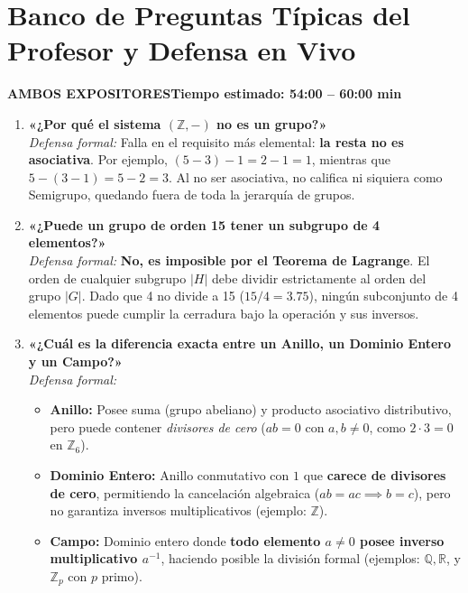 \documentclass[11pt,a4paper]{article}
\newcommand{\badgeAmbos}{\colorbox{green!20}{\textcolor{green!60!black}{\bfseries\sffamily\footnotesize AMBOS EXPOSITORES}}}
\begin{document}
\newpage

\section{Banco de Preguntas Típicas del Profesor y Defensa en Vivo}
\noindent\badgeAmbos \hfill \textbf{Tiempo estimado: 54:00 -- 60:00 min}

\begin{enumerate}[leftmargin=*, label=\bfseries Pregunta \arabic*:]
  \item \textbf{«¿Por qué el sistema $(\mathbb{Z}, -)$ no es un grupo?»}\\
  \textit{Defensa formal:} Falla en el requisito más elemental: \textbf{la resta no es asociativa}. Por ejemplo, $(5-3)-1 = 2-1 = 1$, mientras que $5-(3-1) = 5-2 = 3$. Al no ser asociativa, no califica ni siquiera como Semigrupo, quedando fuera de toda la jerarquía de grupos.

  \item \textbf{«¿Puede un grupo de orden 15 tener un subgrupo de 4 elementos?»}\\
  \textit{Defensa formal:} \textbf{No, es imposible por el Teorema de Lagrange}. El orden de cualquier subgrupo $|H|$ debe dividir estrictamente al orden del grupo $|G|$. Dado que 4 no divide a 15 ($15/4 = 3.75$), ningún subconjunto de 4 elementos puede cumplir la cerradura bajo la operación y sus inversos.

  \item \textbf{«¿Cuál es la diferencia exacta entre un Anillo, un Dominio Entero y un Campo?»}\\
  \textit{Defensa formal:}
  \begin{itemize}[noitemsep]
    \item \textbf{Anillo:} Posee suma (grupo abeliano) y producto asociativo distributivo, pero puede contener \textit{divisores de cero} ($ab=0$ con $a, b \neq 0$, como $2 \cdot 3 = 0$ en $\mathbb{Z}_6$).
    \item \textbf{Dominio Entero:} Anillo conmutativo con $1$ que \textbf{carece de divisores de cero}, permitiendo la cancelación algebraica ($ab=ac \implies b=c$), pero no garantiza inversos multiplicativos (ejemplo: $\mathbb{Z}$).
    \item \textbf{Campo:} Dominio entero donde \textbf{todo elemento $a \neq 0$ posee inverso multiplicativo $a^{-1}$}, haciendo posible la división formal (ejemplos: $\mathbb{Q}, \mathbb{R}$, y $\mathbb{Z}_p$ con $p$ primo).
  \end{itemize}


\end{enumerate}
\end{document}
